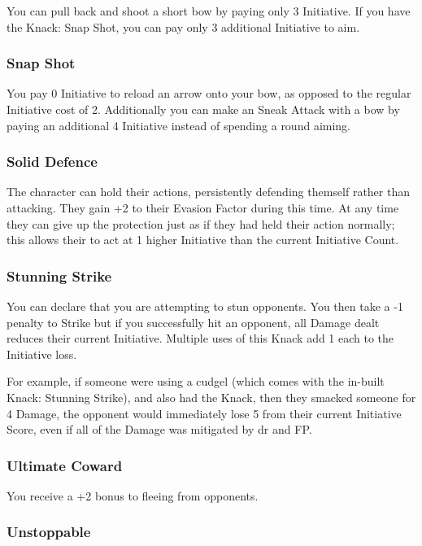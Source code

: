 \documentclass[titlepage,a4paper,openany]{book}
\begin{document}
\begin{multicols}{2}
You can pull back and shoot a short bow by paying only 3 Initiative. If you have the Knack: Snap Shot, you can pay only 3 additional Initiative to aim.

\subsubsection{Snap Shot}

You pay 0 Initiative to reload an arrow onto your bow, as opposed to the regular Initiative cost of 2. Additionally you can make an Sneak Attack with a bow by paying an additional 4 Initiative instead of spending a \gls{round} aiming.

\subsubsection{Solid Defence}\label{soliddefence}

The character can hold their actions, persistently defending themself rather than attacking. They gain +2 to their Evasion Factor during this time. At any time they can give up the protection just as if they had held their action normally; this allows their to act at 1 higher Initiative than the current Initiative Count.

\subsubsection{Stunning Strike}\label{stunningstrike}

You can declare that you are attempting to stun opponents. You then take a -1 penalty to Strike but if you successfully hit an opponent, all Damage dealt reduces their current Initiative. Multiple uses of this Knack add 1 each to the Initiative loss.

For example, if someone were using a cudgel (which comes with the in-built Knack: Stunning Strike), and also had the Knack, then they smacked someone for 4 Damage, the opponent would immediately lose 5 from their current Initiative Score, even if all of the Damage was mitigated by \gls{dr} and FP.

\subsubsection{Ultimate Coward}

You receive a +2 bonus to fleeing from opponents.

\subsubsection{Unstoppable}


\end{multicols}
\end{document}
